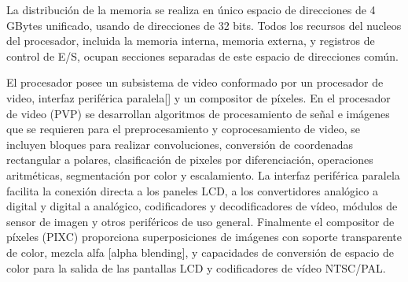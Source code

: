 La distribución de la memoria se realiza en único espacio de direcciones de 4 GBytes  unificado, usando de direcciones de 32 bits. Todos los recursos del nucleos del procesador, incluida la memoria interna, memoria externa, y registros de control de E/S, ocupan secciones separadas de este espacio de direcciones común. 

El procesador posee un subsistema de video conformado por un procesador de video, interfaz periférica paralela[] y un compositor de píxeles. En el procesador de video (PVP) se desarrollan algoritmos de procesamiento de señal e imágenes que se requieren para el preprocesamiento y coprocesamiento de video, se incluyen bloques para realizar convoluciones, conversión de coordenadas rectangular a polares, clasificación de pixeles por diferenciación, operaciones aritméticas, segmentación por color\cite{sevilla} y escalamiento. La interfaz periférica paralela facilita la conexión directa a los paneles LCD, a los convertidores analógico a digital y digital a analógico, codificadores y decodificadores de vídeo, módulos de sensor de imagen y otros periféricos de uso general. Finalmente el compositor de píxeles (PIXC) proporciona superposiciones de imágenes con soporte transparente de color, mezcla alfa [alpha blending], y capacidades de conversión de espacio de color para la salida de las pantallas LCD y codificadores de vídeo NTSC/PAL.







